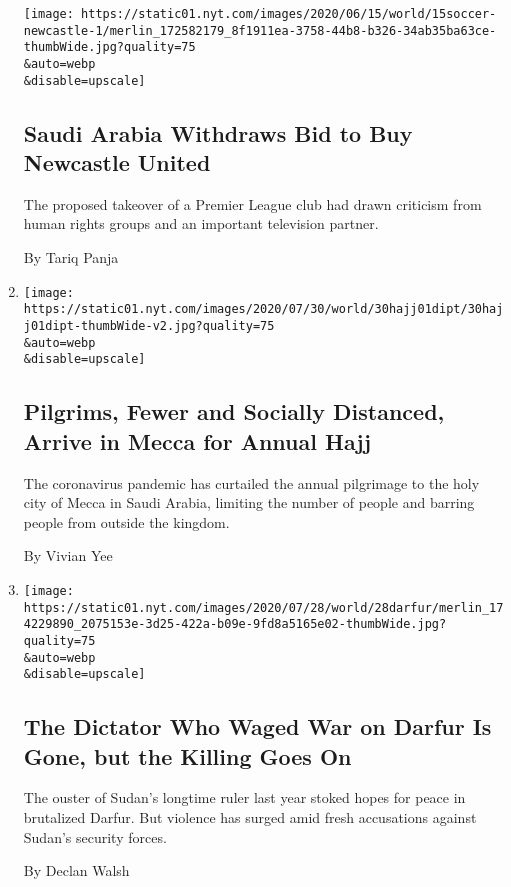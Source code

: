 \begin{enumerate}
  \texttt{[image: https://static01.nyt.com/images/2020/06/15/world/15soccer-newcastle-1/merlin\_172582179\_8f1911ea-3758-44b8-b326-34ab35ba63ce-thumbWide.jpg?quality=75\\\&auto=webp\\\&disable=upscale]}

  \hypertarget{saudi-arabia-withdraws-bid-to-buy-newcastle-united}{%
  \subsection{Saudi Arabia Withdraws Bid to Buy Newcastle
  United}\label{saudi-arabia-withdraws-bid-to-buy-newcastle-united}}

  The proposed takeover of a Premier League club had drawn criticism
  from human rights groups and an important television partner.

  By Tariq Panja
\item
  \href{/2020/07/30/world/middleeast/pilgrims-hajj-mecca-coronavirus-pandemic.html}{}

  \texttt{[image: https://static01.nyt.com/images/2020/07/30/world/30hajj01dipt/30hajj01dipt-thumbWide-v2.jpg?quality=75\\\&auto=webp\\\&disable=upscale]}

  \hypertarget{pilgrims-fewer-and-socially-distanced-arrive-in-mecca-for-annual-hajj}{%
  \subsection{Pilgrims, Fewer and Socially Distanced, Arrive in Mecca
  for Annual
  Hajj}\label{pilgrims-fewer-and-socially-distanced-arrive-in-mecca-for-annual-hajj}}

  The coronavirus pandemic has curtailed the annual pilgrimage to the
  holy city of Mecca in Saudi Arabia, limiting the number of people and
  barring people from outside the kingdom.

  By Vivian Yee
\item
  \href{/2020/07/30/world/middleeast/darfur-sudan.html}{}

  \texttt{[image: https://static01.nyt.com/images/2020/07/28/world/28darfur/merlin\_174229890\_2075153e-3d25-422a-b09e-9fd8a5165e02-thumbWide.jpg?quality=75\\\&auto=webp\\\&disable=upscale]}

  \hypertarget{the-dictator-who-waged-war-on-darfur-is-gone-but-the-killing-goes-on}{%
  \subsection{The Dictator Who Waged War on Darfur Is Gone, but the
  Killing Goes
  On}\label{the-dictator-who-waged-war-on-darfur-is-gone-but-the-killing-goes-on}}

  The ouster of Sudan's longtime ruler last year stoked hopes for peace
  in brutalized Darfur. But violence has surged amid fresh accusations
  against Sudan's security forces.

  By Declan Walsh
\end{enumerate}


